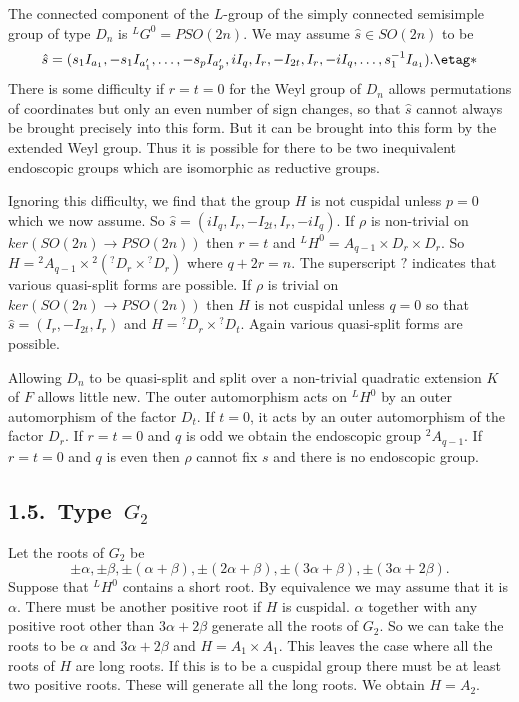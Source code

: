 \documentclass{memo-l}
\theoremstyle{definition}
\theoremstyle{remark}
\numberwithin{section}{chapter}
\numberwithin{equation}{chapter}
\begin{document}
   The connected component of the $L$-group of the simply connected
semisimple group of type $D_{n}$ is ${}^{L}G^{0} = PSO(2n)$.  We may assume
$\hat s  \in  SO(2n)$ to be 
$$
\hat s  = (s_{1}I_{a_{1}},-s_{1}I_{a_{1}'},\ldots,-s_{p}I_{a_{p}'}, 
iI_{q},I_{r},-I_{2t},I_{r},-iI_{q},\ldots ,s_{1}^{-1}I_{a_1}).	 \etag *
$$
There is some difficulty if $r = t = 0$ for the Weyl group of $D_{n}$ allows
permutations of coordinates but only an even number of sign changes, so
that $\hat s $ cannot always be brought precisely into this form.  But it
can be brought into this form by the extended Weyl group.  Thus it is
possible for there to be two inequivalent endoscopic groups which are
isomorphic as reductive groups.

   Ignoring this difficulty, we find that the group $H$ is not cuspidal
unless $p = 0$ which we now assume.  So $\hat s
 = (iI_{q},I_{r},-I_{2t},I_{r},-iI_{q})$.  If ${\rho }$ is non-trivial on
$ker(SO(2n) {\to} PSO(2n))$ then $r = t$ and ${}^{L}H^{0}  =  A_{q-1} \times
D_{r} \times D_{r}$.  So $H  =  {}^{2}A_{q-1} \times {}^{2}({}^{?}D_{r} \times
{}^{?}D_{r})$ where $q+2r = n$.  The superscript $?$ indicates that various
quasi-split forms are possible.  If ${\rho }$ is trivial on $ker(SO(2n)
{\to} PSO(2n))$ then $H$ is not cuspidal unless $q = 0$ so that $\hat s  = 
(I_{r},-I_{2t},I_{r})$ and $H  =  {}^{?}D_{r} \times {}^{?}D_{t}$.  Again
various quasi-split forms are possible.

   Allowing $D_{n}$ to be quasi-split and split over a non-trivial
quadratic extension $K$ of $F$ allows little new.  The outer automorphism
acts on ${}^{L}H^{0}$ by an outer automorphism of the factor $D_{t}$.  If
$t = 0$, it acts by an outer automorphism of the factor $D_{r}$.  If $r = t = 0$
and $q$ is odd we obtain the endoscopic group ${}^{2}A_{q-1}$.  If $r = t = 0$
and $q$ is even then ${\rho }$ cannot fix  $s$ and there is no endoscopic
group.

\subsection{{1.5.\  Type\ $G_2$}}

   Let the roots of $G_{2}$ be $${\pm}{\alpha}, {\pm}{\beta},
{\pm}({\alpha}+{\beta}), {\pm}(2{\alpha}+{\beta}),
{\pm}(3{\alpha}+{\beta}), {\pm}(3{\alpha}+2{\beta}).$$  Suppose that
${}^{L}H^{0}$ contains a short root.  By equivalence we may assume that it is
${\alpha}$.  There must be another positive root if $H$ is cuspidal.
${\alpha}$ together with any positive root other than $3{\alpha}+2{\beta}$
generate all the roots of $G_{2}$.  So we can take the roots to be
${\alpha}$ and $3{\alpha}+2{\beta}$ and $H  =  A_{1} \times A_{1}$.  This
leaves the case where all the roots of $H$ are long roots.  If this is to
be a cuspidal group there must be at least two positive roots.  These will
generate all the long roots.  We obtain $H  =  A_{2}$.
\end{document}
